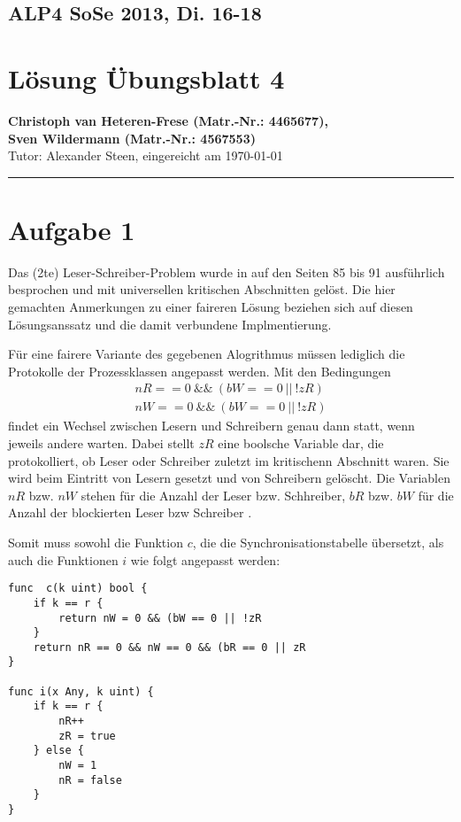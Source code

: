 \documentclass[11pt,a4paper,DIV=10,]{scrartcl}
\begin{document}
\subsection*{ALP4 SoSe 2013, Di. 16-18}
\section*{Lösung Übungsblatt 4}
\textbf{Christoph van Heteren-Frese (Matr.-Nr.: 4465677), \\ Sven Wildermann (Matr.-Nr.: 4567553)}\\
Tutor: Alexander Steen, eingereicht am \today\\
\hrule
\section*{Aufgabe 1}
Das (2te) Leser-Schreiber-Problem wurde in \citep{Maurer.2012} auf den Seiten 85 bis 91 ausführlich besprochen und mit universellen kritischen Abschnitten gelöst. Die hier gemachten Anmerkungen zu einer faireren Lösung beziehen sich auf diesen Lösungsanssatz und die damit verbundene Implmentierung. 

Für eine fairere Variante des gegebenen Alogrithmus müssen lediglich die Protokolle der Prozessklassen angepasst werden. Mit den Bedingungen
\begin{align}
nR == 0\ \&\&\ (bW == 0\ ||\ ! zR) \\
nW == 0\ \&\&\ (bW == 0\ ||\ ! zR) 
\end{align}
findet ein Wechsel zwischen Lesern und Schreibern genau dann statt, wenn jeweils andere warten. Dabei stellt $zR$ eine boolsche Variable dar, die protokolliert, ob Leser oder Schreiber zuletzt im kritischenn Abschnitt waren. Sie wird beim Eintritt von Lesern gesetzt und von Schreibern gelöscht.  Die Variablen $nR$ bzw. $nW$ stehen für die Anzahl der Leser bzw. Schhreiber, $bR$ bzw. $bW$ für die Anzahl der blockierten Leser bzw Schreiber \citep[vgl.][S. 84]{Maurer.2012}.

Somit muss sowohl die Funktion $c$, die die Synchronisationstabelle übersetzt, als auch die Funktionen $i$ wie folgt angepasst werden:
\begin{lstlisting}
func  c(k uint) bool {
	if k == r {
		return nW = 0 && (bW == 0 || !zR
	}
	return nR == 0 && nW == 0 && (bR == 0 || zR
}

func i(x Any, k uint) {
	if k == r {
		nR++
		zR = true
	} else {
		nW = 1
		nR = false
	}
}
\end{lstlisting}
\end{document}
